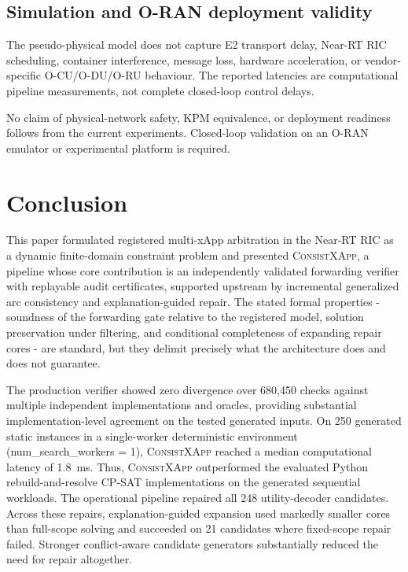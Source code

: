 \documentclass[pdflatex,sn-mathphys-num,iicol,oneside]{sn-jnl}
\newcommand{\method}{\textsc{ConsistXApp}\xspace}
\newcommand{\cpsat}{\textsc{CP-SAT}\xspace}
\begin{document}
\subsection{Simulation and O-RAN deployment validity}

The pseudo-physical model does not capture E2 transport delay,
Near-RT RIC scheduling, container interference, message loss,
hardware acceleration, or vendor-specific O-CU/O-DU/O-RU behaviour.
The reported latencies are computational pipeline measurements, not
complete closed-loop control delays.

No claim of physical-network safety, KPM equivalence, or deployment
readiness follows from the current experiments. Closed-loop
validation on an O-RAN emulator or experimental platform is required.

\section{Conclusion}
\label{sec:conclusion}

This paper formulated registered multi-xApp arbitration in the Near-RT RIC as a dynamic finite-domain constraint problem and presented \method, a pipeline whose core contribution is an independently validated forwarding verifier with replayable audit certificates, supported upstream by incremental generalized arc consistency and explanation-guided repair. The stated formal properties - soundness of the forwarding gate relative to the registered model, solution preservation under filtering, and conditional completeness of expanding repair cores - are standard, but they delimit precisely what the architecture does and does not guarantee.

The production verifier showed zero divergence over 680{,}450 checks against multiple independent implementations and oracles, providing substantial implementation-level agreement on the tested generated inputs. On 250 generated static instances in a single-worker deterministic environment (num\_search\_workers = 1), \method reached a median computational latency of 1.8~ms. Thus, \method outperformed the evaluated Python rebuild-and-resolve \cpsat implementations on the generated sequential workloads. The operational pipeline repaired all 248 utility-decoder candidates. Across these repairs, explanation-guided expansion used markedly smaller cores than full-scope solving and succeeded on 21 candidates where fixed-scope repair failed. Stronger conflict-aware candidate generators substantially reduced the need for repair altogether.
\end{document}
